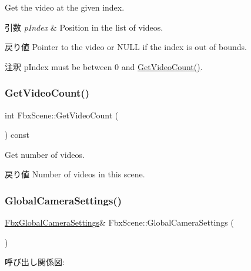 Get the video at the given index. 
\begin{DoxyParams}{引数}
{\em p\+Index} & Position in the list of videos. \\
\hline
\end{DoxyParams}
\begin{DoxyReturn}{戻り値}
Pointer to the video or {\ttfamily N\+U\+LL} if the index is out of bounds. 
\end{DoxyReturn}
\begin{DoxyRemark}{注釈}
p\+Index must be between 0 and \hyperlink{class_fbx_scene_a203455f2e5a9b3891cae6eb516e71b15}{Get\+Video\+Count()}. 
\end{DoxyRemark}
\mbox{\label{class_fbx_scene_a203455f2e5a9b3891cae6eb516e71b15}} 
\subsubsection{\texorpdfstring{Get\+Video\+Count()}{GetVideoCount()}}
{\footnotesize\ttfamily int Fbx\+Scene\+::\+Get\+Video\+Count (\begin{DoxyParamCaption}{ }\end{DoxyParamCaption}) const}

Get number of videos. \begin{DoxyReturn}{戻り値}
Number of videos in this scene. 
\end{DoxyReturn}
\mbox{\label{class_fbx_scene_a029b34d23edd7d05cb0e687b494064ad}} 
\subsubsection{\texorpdfstring{Global\+Camera\+Settings()}{GlobalCameraSettings()}}
{\footnotesize\ttfamily \hyperlink{class_fbx_global_camera_settings}{Fbx\+Global\+Camera\+Settings}\& Fbx\+Scene\+::\+Global\+Camera\+Settings (\begin{DoxyParamCaption}{ }\end{DoxyParamCaption})}

呼び出し関係図\+:
\mbox{\label{class_fbx_scene_a0583b181b70f56655f06dbe79b43fcd6}} 
